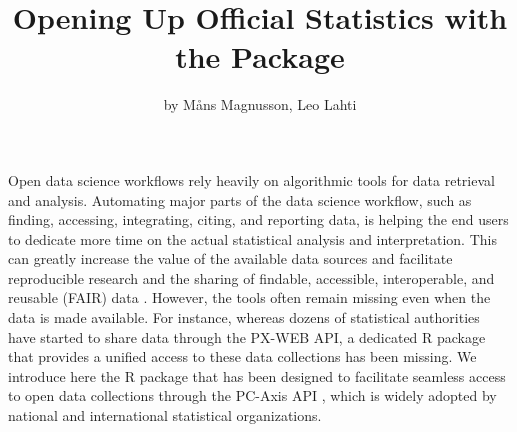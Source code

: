\title{Opening Up Official Statistics with the  Package}
\author{by Måns Magnusson, Leo Lahti}


\maketitle





Open data science workflows rely heavily on algorithmic tools for data
retrieval and analysis. Automating major parts of the data science
workflow, such as finding, accessing, integrating, citing, and
reporting data, is helping the end users to dedicate more time on the
actual statistical analysis and interpretation. This can greatly
increase the value of the available data sources and facilitate
reproducible research \citep{Gandrud13, Boettiger2015} and the sharing
of findable, accessible, interoperable, and reusable (FAIR) data
\cite{xxx}. However, the tools often remain missing even when
the data is made available. For instance, whereas dozens of
statistical authorities have started to share data through the PX-WEB
API, a dedicated R package that provides a unified access to these
data collections has been missing. We introduce here the  R
package that has been designed to facilitate seamless access to open
data collections through the PC-Axis API \cite{xxx}, which is widely
adopted by national and international statistical organizations.

